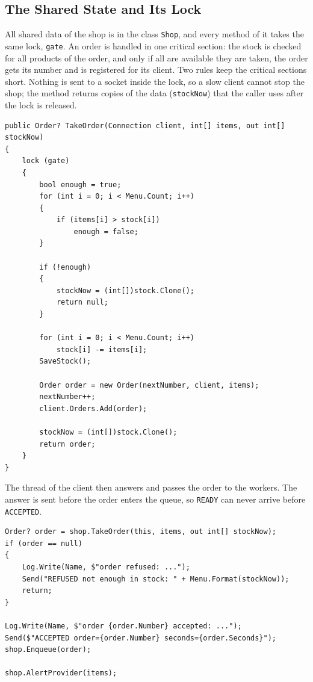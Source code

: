\documentclass[12pt,a4paper]{article}
\begin{document}
\subsection{The Shared State and Its Lock}

All shared data of the shop is in the class \texttt{Shop}, and every method of it takes the same lock, \texttt{gate}. An order is handled in one critical section: the stock is checked for all products of the order, and only if all are available they are taken, the order gets its number and is registered for its client. Two rules keep the critical sections short. Nothing is sent to a socket inside the lock, so a slow client cannot stop the shop; the method returns copies of the data (\texttt{stockNow}) that the caller uses after the lock is released.

\begin{lstlisting}[style=csharp,caption={Checking and taking in one step (Shop.cs)}]
public Order? TakeOrder(Connection client, int[] items, out int[] stockNow)
{
    lock (gate)
    {
        bool enough = true;
        for (int i = 0; i < Menu.Count; i++)
        {
            if (items[i] > stock[i])
                enough = false;
        }

        if (!enough)
        {
            stockNow = (int[])stock.Clone();
            return null;
        }

        for (int i = 0; i < Menu.Count; i++)
            stock[i] -= items[i];
        SaveStock();

        Order order = new Order(nextNumber, client, items);
        nextNumber++;
        client.Orders.Add(order);

        stockNow = (int[])stock.Clone();
        return order;
    }
}
\end{lstlisting}

The thread of the client then answers and passes the order to the workers. The answer is sent before the order enters the queue, so \texttt{READY} can never arrive before \texttt{ACCEPTED}.

\begin{lstlisting}[style=csharp,caption={An accepted order (Connection.HandleOrder)}]
Order? order = shop.TakeOrder(this, items, out int[] stockNow);
if (order == null)
{
    Log.Write(Name, $"order refused: ...");
    Send("REFUSED not enough in stock: " + Menu.Format(stockNow));
    return;
}

Log.Write(Name, $"order {order.Number} accepted: ...");
Send($"ACCEPTED order={order.Number} seconds={order.Seconds}");
shop.Enqueue(order);

shop.AlertProvider(items);
\end{lstlisting}
\end{document}

